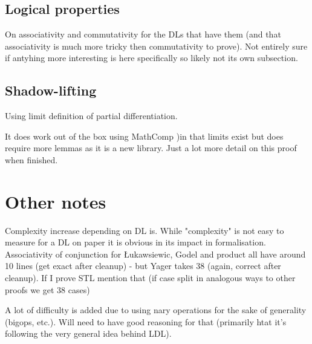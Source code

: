 \documentclass[a4paper,UKenglish,cleveref, autoref, thm-restate]{lipics-v2021}
\begin{document}
\subsection{Logical properties}

On associativity and commutativity for the DLs that have them (and that associativity is much more tricky then commutativity to prove). Not entirely sure if antyhing more interesting is here specifically so likely not its own subsection.

\subsection{Shadow-lifting}

Using limit definition of partial differentiation.

It does work out of the box using MathComp )in that limits exist but does require more lemmas as it is a new library.
Just a lot more detail on this proof when finished.


\section{Other notes}

Complexity increase depending on DL is. While "complexity" is not easy to measure for a DL on paper it is obvious in its impact in formalisation. Associativity of conjunction for Łukawsiewic, Godel and product all have around 10 lines (get exact after cleanup) - but Yager takes 38 (again, correct after cleanup). If I prove STL mention that (if case split in analogous ways to other proofs we get 38 cases)

A lot of difficulty is added due to using nary operations for the sake of generality (bigops, etc.). Will need to have good reasoning for that (primarily htat it's following the very general idea behind LDL).






\appendix
\end{document}
